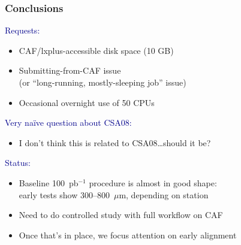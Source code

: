 \documentclass[compress]{beamer}
\begin{document}
\begin{frame}
\frametitle{Conclusions}
\textcolor{darkblue}{Requests:}
\begin{itemize}
\item CAF/lxplus-accessible disk space (10 GB)
\item Submitting-from-CAF issue \\ (or ``long-running, mostly-sleeping job'' issue)
\item Occasional overnight use of 50 CPUs
\end{itemize}

\vfill
\textcolor{darkblue}{Very na\"ive question about CSA08:}
\begin{itemize}\setlength{\itemsep}{0.5 cm}
\item I don't think this is related to CSA08\ldots should it be?
\end{itemize}

\vfill
\textcolor{darkblue}{Status:}
\begin{itemize}
\item Baseline 100~pb$^{-1}$ procedure is almost in good shape: \\ early
tests show 300--800~$\mu$m, depending on station
\item Need to do controlled study with full workflow on CAF
\item Once that's in place, we focus attention on early alignment
\end{itemize}

\label{numpages}
\end{frame}
\end{document}
